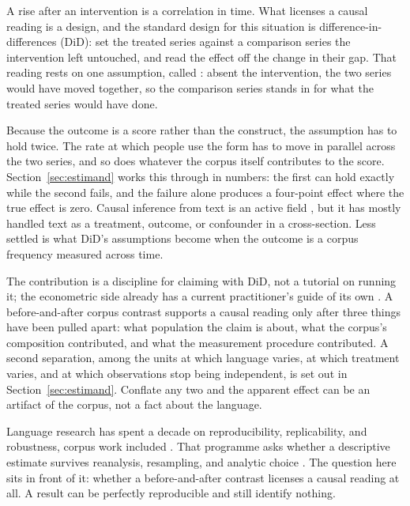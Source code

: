A rise after an intervention is a correlation in time. What licenses a causal reading is a design, and the standard design for this situation is difference-in-differences (DiD): set the treated series against a comparison series the intervention left untouched, and read the effect off the change in their gap. That reading rests on one assumption, called : absent the intervention, the two series would have moved together, so the comparison series stands in for what the treated series would have done.

Because the outcome is a score rather than the construct, the assumption has to hold twice. The rate at which people use the form has to move in parallel across the two series, and so does whatever the corpus itself contributes to the score. Section~\ref{sec:estimand} works this through in numbers: the first can hold exactly while the second fails, and the failure alone produces a four-point effect where the true effect is zero. Causal inference from text is an active field \citep{keith2020text,grimmer2022text,egami2022texts}, but it has mostly handled text as a treatment, outcome, or confounder in a cross-section. Less settled is what DiD's assumptions become when the outcome is a corpus frequency measured across time.

The contribution is a discipline for claiming with DiD, not a tutorial on running it; the econometric side already has a current practitioner's guide of its own \citep{BakerEtAl2026}. A before-and-after corpus contrast supports a causal reading only after three things have been pulled apart: what population the claim is about, what the corpus's composition contributed, and what the measurement procedure contributed. A second separation, among the units at which language varies, at which treatment varies, and at which observations stop being independent, is set out in Section~\ref{sec:estimand}. Conflate any two and the apparent effect can be an artifact of the corpus, not a fact about the language.

Language research has spent a decade on reproducibility, replicability, and robustness, corpus work included \citep{SchweinbergerHaugh2025,Flanagan2025}. That programme asks whether a descriptive estimate survives reanalysis, resampling, and analytic choice \citep{EgbertBiberGrayLarsson2025,Sonning2024}. The question here sits in front of it: whether a before-and-after contrast licenses a causal reading at all. A result can be perfectly reproducible and still identify nothing.

